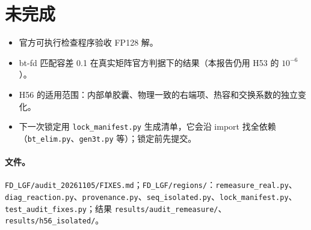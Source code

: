 \documentclass[11pt,a4paper]{ctexart}
\begin{document}
\section{未完成}
\begin{itemize}
\item 官方可执行检查程序验收 FP128 解。
\item bt-fd 匹配容差 0.1 在真实矩阵官方判据下的结果（本报告仍用 H53 的 $10^{-6}$）。
\item H56 的适用范围：内部单胶囊、物理一致的右端项、热容和交换系数的独立变化。
\item 下一次锁定用 \texttt{lock\_manifest.py} 生成清单，它会沿 import 找全依赖（\texttt{bt\_elim.py}、\texttt{gen3t.py} 等）；锁定前先提交。
\end{itemize}

\paragraph{文件。}\texttt{FD\_LGF/audit\_20261105/FIXES.md}；\texttt{FD\_LGF/regions/}：\texttt{remeasure\_real.py}、\texttt{diag\_reaction.py}、\texttt{provenance.py}、\texttt{seq\_isolated.py}、\texttt{lock\_manifest.py}、\texttt{test\_audit\_fixes.py}；结果 \texttt{results/audit\_remeasure/}、\texttt{results/h56\_isolated/}。
\end{document}
